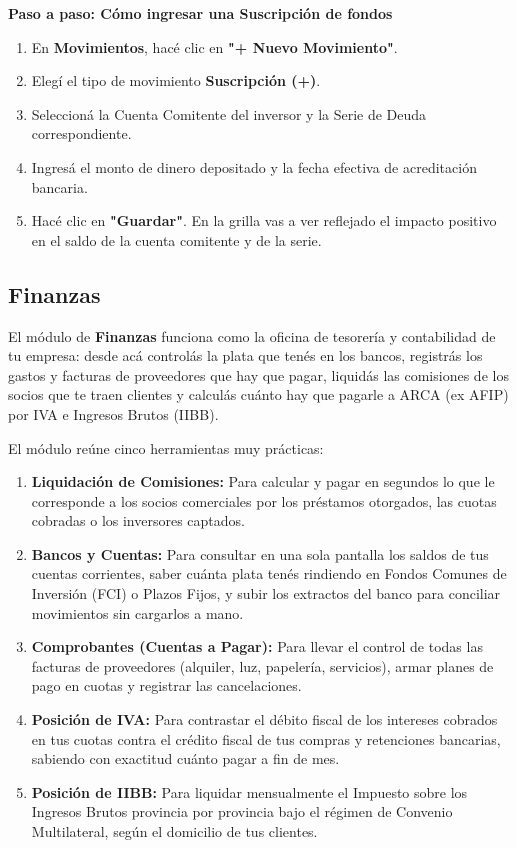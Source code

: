 \documentclass[12pt,a4paper]{article}
\renewcommand{\_}{\textunderscore\allowbreak}
\begin{document}
\textbf{Paso a paso: Cómo ingresar una Suscripción de fondos}
\begin{enumerate}
    \item En \textbf{Movimientos}, hacé clic en \textbf{"+ Nuevo Movimiento"}.
    \item Elegí el tipo de movimiento \textbf{Suscripción (+)}.
    \item Seleccioná la Cuenta Comitente del inversor y la Serie de Deuda correspondiente.
    \item Ingresá el monto de dinero depositado y la fecha efectiva de acreditación bancaria.
    \item Hacé clic en \textbf{"Guardar"}. En la grilla vas a ver reflejado el impacto positivo en el saldo de la cuenta comitente y de la serie.
\end{enumerate}

\subsection{Finanzas}

El módulo de \textbf{Finanzas} funciona como la oficina de tesorería y contabilidad de tu empresa: desde acá controlás la plata que tenés en los bancos, registrás los gastos y facturas de proveedores que hay que pagar, liquidás las comisiones de los socios que te traen clientes y calculás cuánto hay que pagarle a ARCA (ex AFIP) por IVA e Ingresos Brutos (IIBB).

El módulo reúne cinco herramientas muy prácticas:
\begin{enumerate}
    \item \textbf{Liquidación de Comisiones:} Para calcular y pagar en segundos lo que le corresponde a los socios comerciales por los préstamos otorgados, las cuotas cobradas o los inversores captados.
    \item \textbf{Bancos y Cuentas:} Para consultar en una sola pantalla los saldos de tus cuentas corrientes, saber cuánta plata tenés rindiendo en Fondos Comunes de Inversión (FCI) o Plazos Fijos, y subir los extractos del banco para conciliar movimientos sin cargarlos a mano.
    \item \textbf{Comprobantes (Cuentas a Pagar):} Para llevar el control de todas las facturas de proveedores (alquiler, luz, papelería, servicios), armar planes de pago en cuotas y registrar las cancelaciones.
    \item \textbf{Posición de IVA:} Para contrastar el débito fiscal de los intereses cobrados en tus cuotas contra el crédito fiscal de tus compras y retenciones bancarias, sabiendo con exactitud cuánto pagar a fin de mes.
    \item \textbf{Posición de IIBB:} Para liquidar mensualmente el Impuesto sobre los Ingresos Brutos provincia por provincia bajo el régimen de Convenio Multilateral, según el domicilio de tus clientes.
\end{enumerate}
\end{document}
